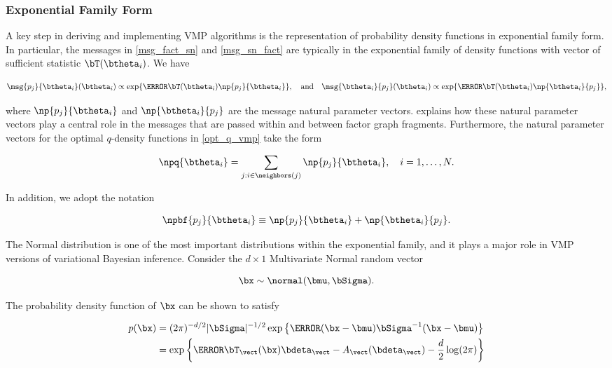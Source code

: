 \documentclass[12pt]{article}
\theoremstyle{plain}
\theoremstyle{definition}
\theoremstyle{remark}
\begin{document}

\subsubsection{Exponential Family Form}
\label{sec:exp_fam_form}

A key step in deriving and implementing VMP algorithms is the representation of probability density functions
in exponential family form. In particular, the messages in \eqref{msg_fact_sn} and \eqref{msg_sn_fact}
are typically in the exponential family of density functions with vector of sufficient statistic $\bT (\btheta_i)$. We have

\[
	\msg{p_j}{\btheta_i} (\btheta_i)
		\propto
			\exp \{ \T{\bT (\btheta_i)} \np{p_j}{\btheta_i} \}, \quad
	\text{and} \quad
	\msg{\btheta_i}{p_j} (\btheta_i)
		\propto
			\exp \{ \T{\bT (\btheta_i)} \np{\btheta_i}{p_j} \},
\]

\noindent where $\np{p_j}{\btheta_i}$ and $\np{\btheta_i}{p_j}$ are the message natural parameter vectors.
 explains how these natural parameter vectors play a central role in the messages that are
passed within and between factor graph fragments. Furthermore, the natural parameter vectors for the
optimal $q$-density functions in \eqref{opt_q_vmp} take the form

\begin{equation}
	\npq{\btheta_i} = \sum_{j : i \in \neighbors(j)} \np{p_j}{\btheta_i}, \quad i = 1, \dots, N.
\label{etaq}
\end{equation}

\noindent In addition, we adopt the notation

\begin{equation}
	\npbf{p_j}{\btheta_i} \equiv \np{p_j}{\btheta_i} + \np{\btheta_i}{p_j}.
\label{npbf}
\end{equation}

The Normal distribution is one of the most important distributions within the exponential family, and it plays a
major role in VMP versions of variational Bayesian inference. Consider the $d \times 1$ Multivariate Normal
random vector

\[
	\bx \sim \normal (\bmu, \bSigma).
\]

\noindent The probability density function of $\bx$ can be shown to satisfy

\begin{align}
\begin{split}
	p(\bx)
		&= (2 \pi)^{-d/2} |\bSigma|^{-1/2} \exp \left\{ \T{(\bx - \bmu)} \bSigma^{-1} (\bx - \bmu) \right\} \\
		&= \exp \left\{ \T{\bT_{\vect} (\bx)} \bdeta_{\vect} - A_{\vect} (\bdeta_{\vect}) - \frac{d}{2} \log (2 \pi) \right\}
\end{split}
\label{vec_repn}
\end{align}
\end{document}

